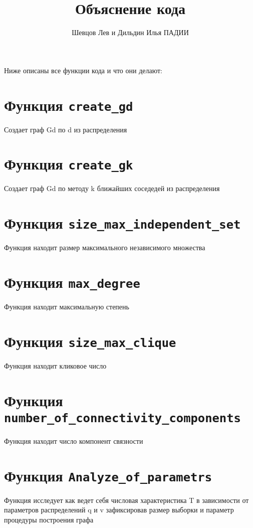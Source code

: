 \documentclass{article}
\title{Объяснение кода}
\author{Шевцов Лев и Дильдин Илья ПАДИИ}
\date{ }
\begin{document}
\maketitle
  
Ниже описаны все функции кода и что они делают:

\section{Функция \texttt{create\_gd}}

Создает граф Gd по d из распределения

\section{Функция \texttt{create\_gk}}

Создает граф Gd по методу k ближайших соседедей из распределения

\section{Функция \texttt{size\_max\_independent\_set}}

Функция находит размер максимального независимого множества

\section{Функция \texttt{max\_degree}}

Функция находит максимальную степень

\section{Функция \texttt{size\_max\_clique}}

Функция находит кликовое число

\section{Функция \texttt{number\_of\_connectivity\_components}}

Функция находит число компонент связности

\section{Функция \texttt{Analyze\_of\_parametrs}}

Функция исследует как ведет себя числовая характеристика T в зависимости от параметров распределений q и v зафиксировав размер выборки и параметр процедуры построения графа
\end{document}
